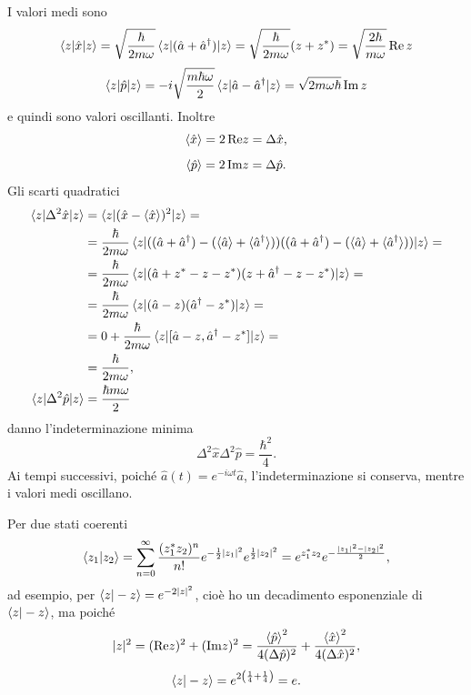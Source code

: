 \bigskip
\noindent
I valori medi sono 
\[
\braket{z|\hat{x}|z} = \sqrt{\frac{\hbar}{2m\omega}} \braket{z|(\hat{a} + \hat{a}^\dag)|z} = \sqrt{\frac{\hbar}{2m\omega}} (z + z^*) = \sqrt{\frac{2\hbar}{m\omega}} \, \text{Re} \,  z
\]
\[
\braket{z|\hat{p}|z} = -i\sqrt{\frac{m\hbar\omega}{2}}\braket{z|\hat{a} - \hat{a}^\dag|z} = \sqrt{2m\omega\hbar} \, \text{Im} \, z
\]
e quindi sono valori oscillanti. Inoltre
\[
\braket{\hat{x}} = 2 \, \text{Re}z = \Delta \hat{x},
\]
\[
\braket{\hat{p}} = 2 \, \text{Im}z = \Delta\hat{p}.
\]
Gli scarti quadratici
\begin{align*}
\braket{z|\Delta^2 \hat{x}|z} &= \braket{z|(\hat{x} - \braket{\hat{x}})^2|z} = \\
&= \frac{\hbar}{2m\omega} \braket{z|((\hat{a} + \hat{a}^\dag) - (\braket{\hat{a}} + \braket{\hat{a}^\dag}))((\hat{a} + \hat{a}^\dag) - (\braket{\hat{a}} + \braket{\hat{a}^\dag}))|z} = \\
&= \frac{\hbar}{2m\omega} \braket{z|(\hat{a} + z^* - z - z^*)(z + \hat{a}^\dag - z - z^*)|z} = \\
&= \frac{\hbar}{2m\omega} \braket{z|(\hat{a} - z)(\hat{a}^\dag - z^*)|z} = \\
&= 0 + \frac{\hbar}{2m\omega} \braket{z|[\hat{a} - z, \hat{a}^\dag - z^*]|z} = \\
&= \frac{\hbar}{2m\omega}, \\
\braket{z|\Delta^2 \hat{p}|z} &= \frac{\hbar m\omega}{2}
\end{align*}
danno l'indeterminazione minima 
\[
\boxed{\Delta^2 \hat{x} \Delta^2 \hat{p} = \frac{\hbar^2}{4}}.
\]
Ai tempi successivi, poiché \( \hat{a}(t) = e^{-i\omega t}\hat{a} \), l'indeterminazione si conserva, mentre i valori medi oscillano.

\bigskip
\noindent
Per due stati coerenti 
\[
\braket{z_1|z_2} = \sum_{n = 0}^\infty \frac{(z_1^* z_2)^n}{n!} e^{-\frac{1}{2}|z_1|^2} e^{\frac{1}{2}|z_2|^2} = e^{z_1^* z_2} e^{-\frac{|z_1|^2 - |z_2|^2}{2}},
\]
ad esempio, per \( \braket{z|-z} = e^{-2|z|^2} \), cioè ho un decadimento esponenziale di \( \braket{z|-z} \), ma poiché 
\[
|z|^2 = (\text{Re}z)^2 + (\text{Im}z)^2 = \frac{\braket{\hat{p}}^2}{4(\Delta\hat{p})^2} + \frac{\braket{\hat{x}}^2}{4(\Delta\hat{x})^2},
\]
\[
\braket{z|-z} = e^{2 \left( \frac{1}{4} + \frac{1}{4} \right)} = e.
\]